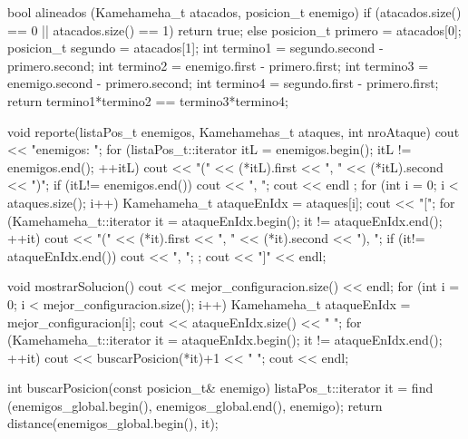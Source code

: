 \documentclass[10pt,a4paper]{article}
\begin{document}
bool alineados (Kamehameha_t atacados, posicion_t enemigo) {
    if (atacados.size() == 0 || atacados.size() == 1) {
        return true;
    } else {
        posicion_t primero = atacados[0];
        posicion_t segundo = atacados[1];
        int termino1 = segundo.second - primero.second;
        int termino2 = enemigo.first - primero.first;
        int termino3 = enemigo.second - primero.second;
        int termino4 = segundo.first - primero.first;
        return termino1*termino2 == termino3*termino4;
    }
}

void reporte(listaPos_t enemigos, Kamehamehas_t ataques, int nroAtaque) {
    cout << "enemigos: ";
    for (listaPos_t::iterator itL = enemigos.begin(); itL != enemigos.end(); ++itL) {
        cout << "(" << (*itL).first << ", " << (*itL).second << ")";
        if (itL!= enemigos.end()) {
            cout << ", ";
        }
    }
    cout << endl ;
    for (int i = 0; i < ataques.size(); i++) {
        Kamehameha_t ataqueEnIdx = ataques[i];
        cout << "[";
        for (Kamehameha_t::iterator it = ataqueEnIdx.begin(); it != ataqueEnIdx.end(); ++it) {
            cout << "(" << (*it).first << ", " << (*it).second << "), ";
            if (it!= ataqueEnIdx.end()){ cout << ", "; };
        }
        cout << "]" << endl;
    }
}

void mostrarSolucion() {
    cout << mejor_configuracion.size() << endl;
    for (int i = 0; i < mejor_configuracion.size(); i++) {
        Kamehameha_t ataqueEnIdx = mejor_configuracion[i];
        cout << ataqueEnIdx.size() << " ";
        for (Kamehameha_t::iterator it = ataqueEnIdx.begin(); it != ataqueEnIdx.end(); ++it) {
            cout << buscarPosicion(*it)+1 << " ";
        }
        cout << endl;
    }
}

int buscarPosicion(const posicion_t& enemigo) {
    listaPos_t::iterator it = find (enemigos_global.begin(), enemigos_global.end(), enemigo);
    return distance(enemigos_global.begin(), it);
}
\end{document}
